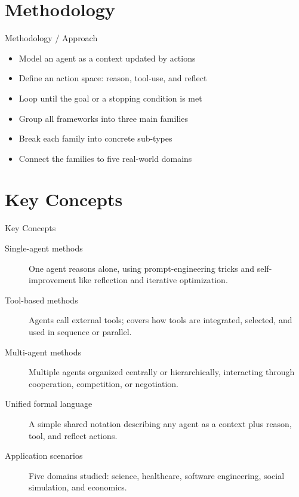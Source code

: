 \documentclass[10pt]{beamer}
\begin{document}
\section{Methodology}
\begin{frame}[allowframebreaks]{Methodology / Approach}
\begin{itemize}
  \item Model an agent as a context updated by actions
  \item Define an action space: reason, tool-use, and reflect
  \item Loop until the goal or a stopping condition is met
  \item Group all frameworks into three main families
  \item Break each family into concrete sub-types
  \item Connect the families to five real-world domains
\end{itemize}
\end{frame}

\section{Key Concepts}
\begin{frame}[allowframebreaks]{Key Concepts}
  \begin{description}
    \item[Single-agent methods] One agent reasons alone, using prompt-engineering tricks and self-improvement like reflection and iterative optimization.
    \item[Tool-based methods] Agents call external tools; covers how tools are integrated, selected, and used in sequence or parallel.
    \item[Multi-agent methods] Multiple agents organized centrally or hierarchically, interacting through cooperation, competition, or negotiation.
    \item[Unified formal language] A simple shared notation describing any agent as a context plus reason, tool, and reflect actions.
    \item[Application scenarios] Five domains studied: science, healthcare, software engineering, social simulation, and economics.
  \end{description}
\end{frame}
\end{document}

